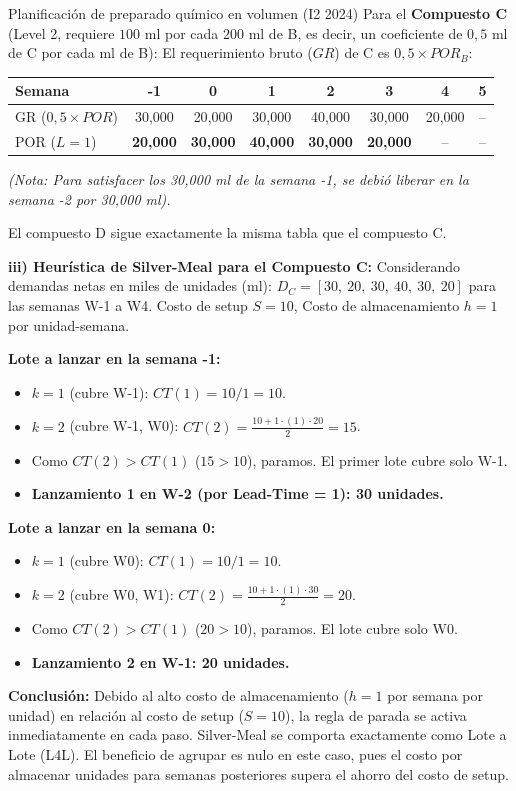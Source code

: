 \begin{ejercicio}{Planificación de preparado químico en volumen (I2 2024)}
Para el \textbf{Compuesto C} (Level 2, requiere $100\text{ ml}$ por cada $200\text{ ml}$ de B, es decir, un coeficiente de $0{,}5\text{ ml}$ de C por cada ml de B):
El requerimiento bruto ($GR$) de C es $0{,}5 \times POR_B$:
\begin{center}\small
\begin{tabular}{@{}lccccccc@{}}
  \toprule
  Semana & -1 & 0 & 1 & 2 & 3 & 4 & 5 \\
  \midrule
  GR ($0{,}5\times POR$) & 30{,}000 & 20{,}000 & 30{,}000 & 40{,}000 & 30{,}000 & 20{,}000 & -- \\
  POR ($L=1$)            & \textbf{20{,}000} & \textbf{30{,}000} & \textbf{40{,}000} & \textbf{30{,}000} & \textbf{20{,}000} & -- & -- \\
  \bottomrule
\end{tabular}
\end{center}
\textit{(Nota: Para satisfacer los 30,000 ml de la semana -1, se debió liberar en la semana -2 por 30,000 ml).}

El compuesto D sigue exactamente la misma tabla que el compuesto C.

\textbf{iii) Heurística de Silver-Meal para el Compuesto C:}
Considerando demandas netas en miles de unidades (ml): $D_C = [30,\ 20,\ 30,\ 40,\ 30,\ 20]$ para las semanas W-1 a W4.
Costo de setup $S = 10$, Costo de almacenamiento $h = 1$ por unidad-semana.

\textbf{Lote a lanzar en la semana -1:}
\begin{itemize}[leftmargin=1.4em, itemsep=1pt]
  \item $k=1$ (cubre W-1): $CT(1) = 10 / 1 = 10$.
  \item $k=2$ (cubre W-1, W0): $CT(2) = \frac{10 + 1 \cdot (1) \cdot 20}{2} = 15$.
  \item Como $CT(2) > CT(1)$ ($15 > 10$), paramos. El primer lote cubre solo W-1.
  \item \textbf{Lanzamiento 1 en W-2 (por Lead-Time = 1): 30 unidades.}
\end{itemize}

\textbf{Lote a lanzar en la semana 0:}
\begin{itemize}[leftmargin=1.4em, itemsep=1pt]
  \item $k=1$ (cubre W0): $CT(1) = 10 / 1 = 10$.
  \item $k=2$ (cubre W0, W1): $CT(2) = \frac{10 + 1 \cdot (1) \cdot 30}{2} = 20$.
  \item Como $CT(2) > CT(1)$ ($20 > 10$), paramos. El lote cubre solo W0.
  \item \textbf{Lanzamiento 2 en W-1: 20 unidades.}
\end{itemize}

\textbf{Conclusión:} Debido al alto costo de almacenamiento ($h = 1$ por semana por unidad) en relación al costo de setup ($S = 10$), la regla de parada se activa inmediatamente en cada paso. Silver-Meal se comporta exactamente como Lote a Lote (L4L). El beneficio de agrupar es nulo en este caso, pues el costo por almacenar unidades para semanas posteriores supera el ahorro del costo de setup.
\end{ejercicio}


